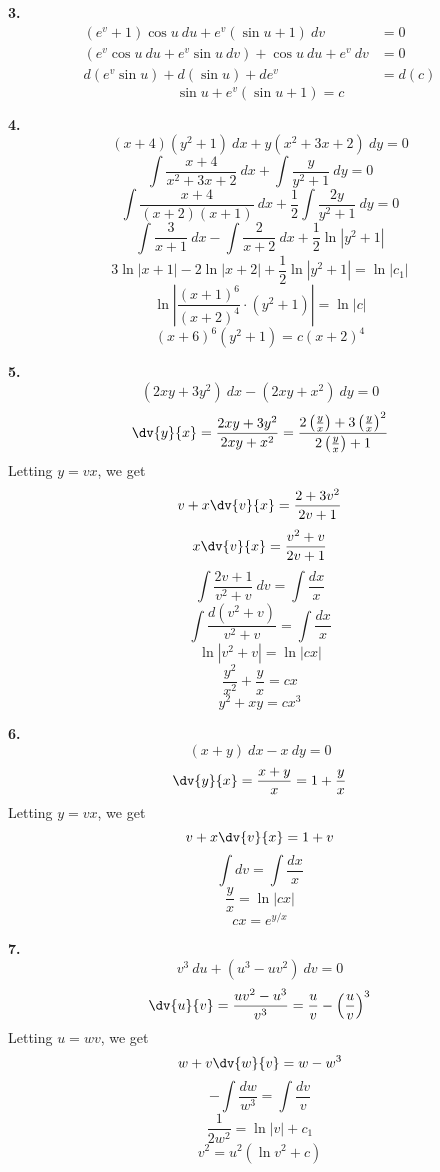 \begin{exercise}
    \textbf{3.}
    \begin{align*}
        (e^v+1)\cos{u} \: d{u} + e^v(\sin{u}+1) \: d{v} &= 0 \\
        (e^v\cos{u} \: du + e^v\sin{u} \: dv) + \cos{u} \: du + e^v \: dv &= 0 \\
        d(e^v\sin u) + d(\sin u) + d{e^v} &= d(c)
    \end{align*}
    \[ \boxed{\sin u + e^v(\sin u + 1) = c} \]

    \textbf{4.}
    \[ (x+4)(y^2+1) \: d{x} + y(x^2+3x+2) \: d{y} = 0 \]
    \[ \int{\frac{x+4}{x^2+3x+2}} \: d{x} + \int{\frac{y}{y^2+1}} \: d{y} = 0 \]
    \[ \int{\frac{x+4}{(x+2)(x+1)}} \: d{x} + \frac{1}{2}\int{\frac{2y}{y^2+1}} \: d{y} = 0 \]
    \[ \int{\frac{3}{x+1}} \: d{x} - \int{\frac{2}{x+2}} \: d{x} + \frac{1}{2}\ln|y^2+1| \]
    \[ 3\ln|x+1| - 2\ln|x+2| + \frac{1}{2}\ln|y^2+1| = \ln|c_1| \]
    \[ \ln \left| \frac{(x+1)^6}{(x+2)^4} \cdot (y^2+1) \right| = \ln|c| \]
    \[ \boxed{(x+6)^6 (y^2+1) = c(x+2)^4} \]

    \begin{multicols}{2}
        \textbf{5.}
        \[ (2xy + 3y^2) \: d{x} - (2xy + x^2) \: d{y} = 0 \]
        \[ \dv{y}{x} = \frac{2xy + 3y^2}{2xy + x^2} = \frac{2\left(\frac{y}{x}\right) + 3\left(\frac{y}{x}\right)^2}{2\left(\frac{y}{x}\right) + 1} \]
        Letting $y = vx$, we get \[
            v + x\dv{v}{x} = \frac{2 + 3v^2}{2v + 1}
            \] \[ x\dv{v}{x} = \frac{v^2 + v}{2v + 1} \]
            \[ \int{\frac{2v+1}{v^2+v}} \: d{v} = \int{\frac{dx}{x}} \]
            \[ \int{\frac{d(v^2+v)}{v^2+v}} = \int{\frac{dx}{x}} \]
            \[ \ln|v^2+v| = \ln|cx| \]
            \[ \frac{y^2}{x^2} + \frac{y}{x} = cx \]
            \[ \boxed{y^2 + xy = cx^3} \]

        \columnbreak

        \textbf{6.}
        \[ (x+y) \: d{x} - x \: d{y} = 0 \]
        \[ \dv{y}{x} = \frac{x+y}{x} = 1+\frac{y}{x} \]
        Letting $y = vx$, we get
        \[ v + x\dv{v}{x} = 1 + v \]
        \[ \int{dv} = \int{\frac{dx}{x}} \]
        \[ \frac{y}{x} = \ln|cx| \]
        \[ \boxed{cx = e^{y/x}} \]
    \end{multicols}

    \begin{multicols}{2}
        \textbf{7.}
        \[ v^3 \: d{u} + (u^3 - uv^2) \: d{v} = 0 \]
        \[ \dv{u}{v} = \frac{uv^2 - u^3}{v^3} = \frac{u}{v} - \left( \frac{u}{v} \right)^3 \]
        Letting $u = wv$, we get
        \[ w + v\dv{w}{v} = w - w^3 \]
        \[ -\int{\frac{dw}{w^3}} = \int{\frac{dv}{v}} \]
        \[ \frac{1}{2w^2} = \ln|v| + c_1 \]
        \[ \boxed{v^2 = u^2(\ln v^2 + c)} \]


\end{multicols}
\end{exercise}
